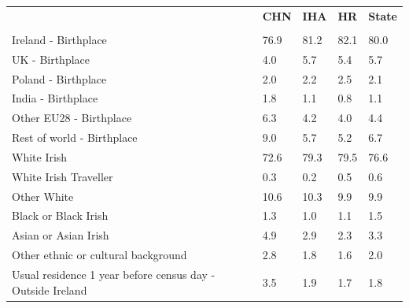 \documentclass{article}
\begin{document}
\pagebreak
\begin{table}[h]	
\centering
		\begin{tabular}{KTTTT}
  \hline
& \textbf{CHN} & \textbf{IHA} & \textbf{HR}& \textbf{State}\\ 
  \hline
    \\ 
    \hline
Ireland - Birthplace & 76.9& 81.2& 82.1& 80.0\\
UK - Birthplace & 4.0& 5.7& 5.4& 5.7\\
Poland - Birthplace & 2.0& 2.2& 2.5& 2.1\\
India - Birthplace & 1.8& 1.1& 0.8& 1.1\\
Other EU28 - Birthplace & 6.3& 4.2& 4.0& 4.4\\
Rest of world - Birthplace & 9.0& 5.7& 5.2& 6.7\\
    \hline
White Irish & 72.6& 79.3& 79.5& 76.6\\
White Irish Traveller & 0.3& 0.2& 0.5& 0.6\\
Other White & 10.6& 10.3&  9.9&  9.9\\
Black or Black Irish & 1.3& 1.0& 1.1& 1.5\\
Asian or Asian Irish & 4.9& 2.9& 2.3& 3.3\\
Other ethnic or cultural background & 2.8& 1.8& 1.6& 2.0\\
    \hline
Usual residence 1 year before census day - Outside Ireland & 3.5& 1.9& 1.7& 1.8\\


\end{tabular}
\end{table}
\end{document}

